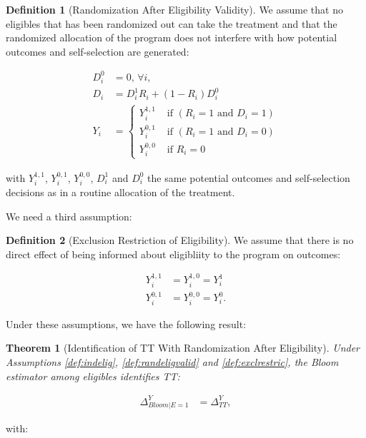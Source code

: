 \documentclass[
]{book}
\newtheorem{theorem}{Theorem}[chapter]
\theoremstyle{definition}
\newtheorem{definition}{Definition}[chapter]
\theoremstyle{definition}
\theoremstyle{definition}
\theoremstyle{definition}
\theoremstyle{remark}
\begin{document}
\begin{definition}[Randomization After Eligibility Validity]
\protect\hypertarget{def:randeligvalid}{}{\label{def:randeligvalid} \iffalse (Randomization After Eligibility Validity) \fi{} }We assume that no eligibles that has been randomized out can take the treatment and that the randomized allocation of the program does not interfere with how potential outcomes and self-selection are generated:

\begin{align*}
D_i^0 & = 0\text{, } \forall i, \\
D_i & = D_i^1R_i+(1-R_i)D_i^0 \\
Y_i & = 
  \begin{cases}
    Y_i^{1,1} & \text{ if } (R_i=1 \text{ and } D_i=1)   \\
    Y_i^{0,1} & \text{ if } (R_i=1 \text{ and } D_i=0)    \\
    Y_i^{0,0} & \text{ if } R_i=0
  \end{cases}
\end{align*}
\end{definition}
with \(Y_i^{1,1}\), \(Y_i^{0,1}\), \(Y_i^{0,0}\), \(D_i^1\) and \(D^0_i\) the same potential outcomes and self-selection decisions as in a routine allocation of the treatment.

We need a third assumption:

\begin{definition}[Exclusion Restriction of Eligibility]
\protect\hypertarget{def:exclrestric}{}{\label{def:exclrestric} \iffalse (Exclusion Restriction of Eligibility) \fi{} }We assume that there is no direct effect of being informed about eligibliity to the program on outcomes:

\begin{align*}
  Y_i^{1,1} & = Y_i^{1,0}= Y_i^1\\
  Y_i^{0,1} & = Y_i^{0,0}= Y_i^0.
\end{align*}
\end{definition}

Under these assumptions, we have the following result:

\begin{theorem}[Identification of TT With Randomization After Eligibility]
\protect\hypertarget{thm:identTTRAE}{}{\label{thm:identTTRAE} \iffalse (Identification of TT With Randomization After Eligibility) \fi{} }Under Assumptions \ref{def:indelig}, \ref{def:randeligvalid} and \ref{def:exclrestric}, the Bloom estimator among eligibles identifies TT:

\begin{align*}
  \Delta^Y_{Bloom|E=1} & = \Delta^Y_{TT},
\end{align*}
\end{theorem}
with:
\end{document}
